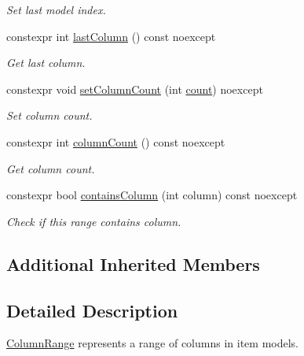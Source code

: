 \begin{DoxyCompactItemize}
\begin{DoxyCompactList}\small\item\em Set last model index. \end{DoxyCompactList}\item 
constexpr int \hyperlink{class_mdt_1_1_item_model_1_1_column_range_ac30c5a7cfbddf6c0782994d9dc5c8dde}{last\+Column} () const noexcept
\begin{DoxyCompactList}\small\item\em Get last column. \end{DoxyCompactList}\item 
constexpr void \hyperlink{class_mdt_1_1_item_model_1_1_column_range_a87b7de8e6254da4e1cc7559677c57288}{set\+Column\+Count} (int \hyperlink{class_mdt_1_1_item_model_1_1_range_a5677e5e280f1153607c4d30d3816b5f2}{count}) noexcept
\begin{DoxyCompactList}\small\item\em Set column count. \end{DoxyCompactList}\item 
constexpr int \hyperlink{class_mdt_1_1_item_model_1_1_column_range_ae43fc5f90e529b4e0e9f6e462cda4768}{column\+Count} () const noexcept
\begin{DoxyCompactList}\small\item\em Get column count. \end{DoxyCompactList}\item 
constexpr bool \hyperlink{class_mdt_1_1_item_model_1_1_column_range_aa39f74071a22d2fdde34a72e07c8e6a3}{contains\+Column} (int column) const noexcept\hypertarget{class_mdt_1_1_item_model_1_1_column_range_aa39f74071a22d2fdde34a72e07c8e6a3}{}\label{class_mdt_1_1_item_model_1_1_column_range_aa39f74071a22d2fdde34a72e07c8e6a3}

\begin{DoxyCompactList}\small\item\em Check if this range contains column. \end{DoxyCompactList}\end{DoxyCompactItemize}
\subsection*{Additional Inherited Members}


\subsection{Detailed Description}
\hyperlink{class_mdt_1_1_item_model_1_1_column_range}{Column\+Range} represents a range of columns in item models. 

